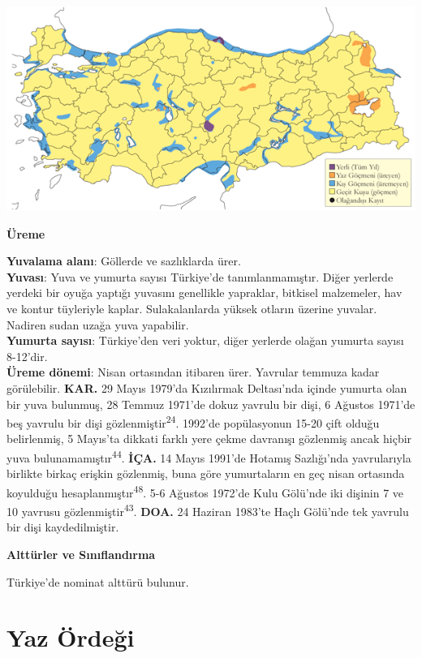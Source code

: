 \documentclass[
  letterpaper,
  DIV=11,
  numbers=noendperiod]{scrreprt}
\begin{document}
\includegraphics{images/harita_Page_020.png}

\textbf{Üreme}

\textbf{Yuvalama alanı}: Göllerde ve sazlıklarda ürer.\\
\textbf{Yuvası}: Yuva ve yumurta sayısı Türkiye'de tanımlanmamıştır.
Diğer yerlerde yerdeki bir oyuğa yaptığı yuvasını genellikle yapraklar,
bitkisel malzemeler, hav ve kontur tüyleriyle kaplar. Sulakalanlarda
yüksek otların üzerine yuvalar. Nadiren sudan uzağa yuva yapabilir.\\
\textbf{Yumurta sayısı}: Türkiye'den veri yoktur, diğer yerlerde olağan
yumurta sayısı 8-12'dir.\\
\textbf{Üreme dönemi}: Nisan ortasından itibaren ürer. Yavrular temmuza
kadar görülebilir. \textbf{KAR.} 29 Mayıs 1979'da Kızılırmak Deltası'nda
içinde yumurta olan bir yuva bulunmuş, 28 Temmuz 1971'de dokuz yavrulu
bir dişi, 6 Ağustos 1971'de beş yavrulu bir dişi
gözlenmiştir\textsuperscript{24}. 1992'de popülasyonun 15-20 çift olduğu
belirlenmiş, 5 Mayıs'ta dikkati farklı yere çekme davranışı gözlenmiş
ancak hiçbir yuva bulunamamıştır\textsuperscript{44}. \textbf{İÇA.} 14
Mayıs 1991'de Hotamış Sazlığı'nda yavrularıyla birlikte birkaç erişkin
gözlenmiş, buna göre yumurtaların en geç nisan ortasında koyulduğu
hesaplanmıştır\textsuperscript{48}. 5-6 Ağustos 1972'de Kulu Gölü'nde
iki dişinin 7 ve 10 yavrusu gözlenmiştir\textsuperscript{43}.
\textbf{DOA.} 24 Haziran 1983'te Haçlı Gölü'nde tek yavrulu bir dişi
kaydedilmiştir.

\textbf{Alttürler ve Sınıflandırma}

Türkiye'de nominat alttürü bulunur.

\section{Yaz Ördeği}\label{yaz-uxf6rdeux11fi}
\end{document}
